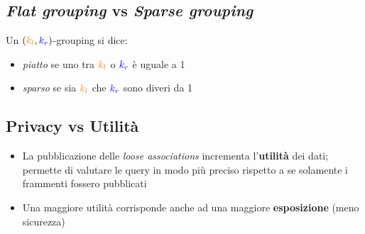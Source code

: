 \documentclass{report}
\begin{document}
\subsection{\textit{Flat grouping} vs \textit{Sparse grouping}}
Un $(\textcolor{orange}{k_l}, \textcolor{blue}{k_r})$-grouping si dice:
\begin{itemize}
    \item \textit{piatto} se uno tra $\textcolor{orange}{k_l}$ o $\textcolor{blue}{k_r}$ è uguale a 1
    \item \textit{sparso} se sia $\textcolor{orange}{k_l}$ che $\textcolor{blue}{k_r}$ sono diveri da 1
\end{itemize}

\subsection{Privacy vs Utilità}
\begin{itemize}
    \item La pubblicazione delle \textit{loose associations} incrementa l'\textbf{utilità}
    dei dati; permette di valutare le query in modo più preciso rispetto a se solamente 
    i frammenti fossero pubblicati 
    \item Una maggiore utilità corrisponde anche ad una maggiore \textbf{esposizione} (meno sicurezza)
\end{itemize}
\end{document}
